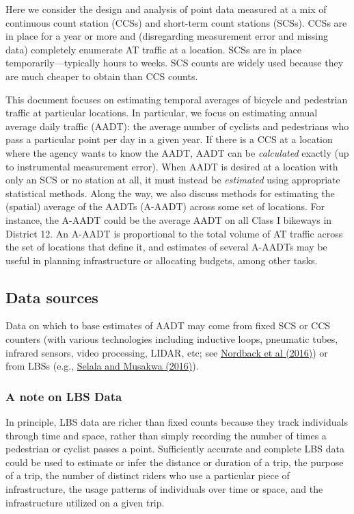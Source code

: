 \documentclass[11pt]{article}
\begin{document}
Here we consider the design and analysis of point data measured at a mix
of continuous count station (CCSs) and short-term count stations (SCSs).
CCSs are in place for a year or more and (disregarding measurement error
and missing data) completely enumerate AT traffic at a location. SCSs
are in place temporarily---typically hours to weeks. SCS counts are
widely used because they are much cheaper to obtain than CCS counts.

This document focuses on estimating temporal averages of bicycle and
pedestrian traffic at particular locations. In particular, we focus on
estimating annual average daily traffic (AADT): the average number of
cyclists and pedestrians who pass a particular point per day in a given
year. If there is a CCS at a location where the agency wants to know the
AADT, AADT can be \emph{calculated} exactly (up to instrumental
measurement error). When AADT is desired at a location with only an SCS
or no station at all, it must instead be \emph{estimated} using
appropriate statistical methods. Along the way, we also discuss methods
for estimating the (spatial) average of the AADTs (A-AADT) across some
set of locations. For instance, the A-AADT could be the average AADT on
all Class I bikeways in District 12. An A-AADT is proportional to the
total volume of AT traffic across the set of locations that define it,
and estimates of several A-AADTs may be useful in planning
infrastructure or allocating budgets, among other tasks.

\subsection{Data sources}\label{data-sources}

Data on which to base estimates of AADT may come from fixed SCS or CCS
counters (with various technologies including inductive loops, pneumatic
tubes, infrared sensors, video processing, LIDAR, etc; see
\href{https://www.oregon.gov/odot/Programs/ResearchDocuments/SPR772_Bicycle_PedestrianTechnologies.pdf}{Nordback
et al (2016)}) or from LBSs (e.g.,
\href{https://isprs-archives.copernicus.org/articles/XLI-B2/587/2016/isprs-archives-XLI-B2-587-2016.pdf}{Selala
and Musakwa (2016)}).

\subsubsection{A note on LBS Data}\label{a-note-on-lbs-data}

In principle, LBS data are richer than fixed counts because they track
individuals through time and space, rather than simply recording the
number of times a pedestrian or cyclist passes a point. Sufficiently
accurate and complete LBS data could be used to estimate or infer the
distance or duration of a trip, the purpose of a trip, the number of
distinct riders who use a particular piece of infrastructure, the usage
patterns of individuals over time or space, and the infrastructure
utilized on a given trip.
\end{document}
